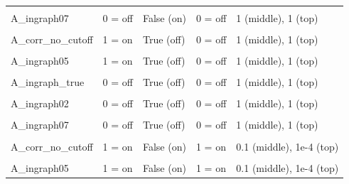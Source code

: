 \documentclass[
]{article}
\begin{document}
\begin{longtable}[t]{>{\raggedright\arraybackslash}p{8em}llll}
\cellcolor{gray!10}{A\_ingraph05} & \cellcolor{gray!10}{0 = off} & \cellcolor{gray!10}{False (on)} & \cellcolor{gray!10}{0 = off} & \cellcolor{gray!10}{1 (middle), 1 (top)}\\
A\_ingraph07 & 0 = off & False (on) & 0 = off & 1 (middle), 1 (top)\\
\addlinespace
\cellcolor{gray!10}{A\_ingraph\_true} & \cellcolor{gray!10}{1 = on} & \cellcolor{gray!10}{True (off)} & \cellcolor{gray!10}{0 = off} & \cellcolor{gray!10}{1 (middle), 1 (top)}\\
A\_corr\_no\_cutoff & 1 = on & True (off) & 0 = off & 1 (middle), 1 (top)\\
\cellcolor{gray!10}{A\_ingraph02} & \cellcolor{gray!10}{1 = on} & \cellcolor{gray!10}{True (off)} & \cellcolor{gray!10}{0 = off} & \cellcolor{gray!10}{1 (middle), 1 (top)}\\
A\_ingraph05 & 1 = on & True (off) & 0 = off & 1 (middle), 1 (top)\\
\cellcolor{gray!10}{A\_ingraph07} & \cellcolor{gray!10}{1 = on} & \cellcolor{gray!10}{True (off)} & \cellcolor{gray!10}{0 = off} & \cellcolor{gray!10}{1 (middle), 1 (top)}\\
\addlinespace
A\_ingraph\_true & 0 = off & True (off) & 0 = off & 1 (middle), 1 (top)\\
\cellcolor{gray!10}{A\_corr\_no\_cutoff} & \cellcolor{gray!10}{0 = off} & \cellcolor{gray!10}{True (off)} & \cellcolor{gray!10}{0 = off} & \cellcolor{gray!10}{1 (middle), 1 (top)}\\
A\_ingraph02 & 0 = off & True (off) & 0 = off & 1 (middle), 1 (top)\\
\cellcolor{gray!10}{A\_ingraph05} & \cellcolor{gray!10}{0 = off} & \cellcolor{gray!10}{True (off)} & \cellcolor{gray!10}{0 = off} & \cellcolor{gray!10}{1 (middle), 1 (top)}\\
A\_ingraph07 & 0 = off & True (off) & 0 = off & 1 (middle), 1 (top)\\
\addlinespace
\cellcolor{gray!10}{A\_ingraph\_true} & \cellcolor{gray!10}{1 = on} & \cellcolor{gray!10}{False (on)} & \cellcolor{gray!10}{1 = on} & \cellcolor{gray!10}{0.1 (middle), 1e-4 (top)}\\
A\_corr\_no\_cutoff & 1 = on & False (on) & 1 = on & 0.1 (middle), 1e-4 (top)\\
\cellcolor{gray!10}{A\_ingraph02} & \cellcolor{gray!10}{1 = on} & \cellcolor{gray!10}{False (on)} & \cellcolor{gray!10}{1 = on} & \cellcolor{gray!10}{0.1 (middle), 1e-4 (top)}\\
A\_ingraph05 & 1 = on & False (on) & 1 = on & 0.1 (middle), 1e-4 (top)\\

\end{longtable}
\end{document}
